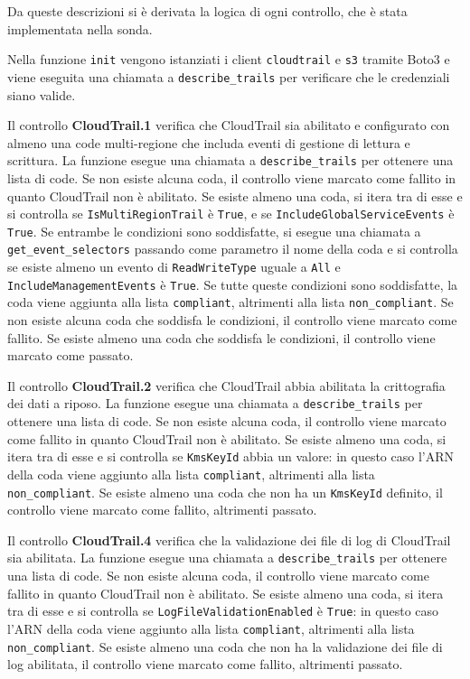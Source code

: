 Da queste descrizioni si è derivata la logica di ogni controllo, che è stata implementata nella sonda. 

Nella funzione \texttt{init} vengono istanziati i client \texttt{cloudtrail} e \texttt{s3} tramite Boto3 e viene eseguita una chiamata a \texttt{describe\_trails} per verificare che le credenziali siano valide.

Il controllo \textbf{CloudTrail.1} verifica che CloudTrail sia abilitato e configurato con almeno una code multi-regione che includa eventi di gestione di lettura e scrittura. La funzione esegue una chiamata a \texttt{describe\_trails} per ottenere una lista di code. Se non esiste alcuna coda, il controllo viene marcato come fallito in quanto CloudTrail non è abilitato. Se esiste almeno una coda, si itera tra di esse e si controlla se \texttt{IsMultiRegionTrail} è \texttt{True}, e se \texttt{IncludeGlobalServiceEvents} è \texttt{True}. Se entrambe le condizioni sono soddisfatte, si esegue una chiamata a \texttt{get\_event\_selectors} passando come parametro il nome della coda e si controlla se esiste almeno un evento di \texttt{ReadWriteType} uguale a \texttt{All} e \texttt{IncludeManagementEvents} è \texttt{True}. Se tutte queste condizioni sono soddisfatte, la coda viene aggiunta alla lista \texttt{compliant}, altrimenti alla lista \texttt{non\_compliant}. Se non esiste alcuna coda che soddisfa le condizioni, il controllo viene marcato come fallito. Se esiste almeno una coda che soddisfa le condizioni, il controllo viene marcato come passato.

Il controllo \textbf{CloudTrail.2} verifica che CloudTrail abbia abilitata la crittografia dei dati a riposo. La funzione esegue una chiamata a \texttt{describe\_trails} per ottenere una lista di code. Se non esiste alcuna coda, il controllo viene marcato come fallito in quanto CloudTrail non è abilitato. Se esiste almeno una coda, si itera tra di esse e si controlla se \texttt{KmsKeyId} abbia un valore: in questo caso l'ARN della coda viene aggiunto alla lista \texttt{compliant}, altrimenti alla lista \texttt{non\_compliant}. Se esiste almeno una coda che non ha un \texttt{KmsKeyId} definito, il controllo viene marcato come fallito, altrimenti passato.

Il controllo \textbf{CloudTrail.4} verifica che la validazione dei file di log di CloudTrail sia abilitata. La funzione esegue una chiamata a \texttt{describe\_trails} per ottenere una lista di code. Se non esiste alcuna coda, il controllo viene marcato come fallito in quanto CloudTrail non è abilitato. Se esiste almeno una coda, si itera tra di esse e si controlla se \texttt{LogFileValidationEnabled} è \texttt{True}: in questo caso l'ARN della coda viene aggiunto alla lista \texttt{compliant}, altrimenti alla lista \texttt{non\_compliant}. Se esiste almeno una coda che non ha la validazione dei file di log abilitata, il controllo viene marcato come fallito, altrimenti passato.

